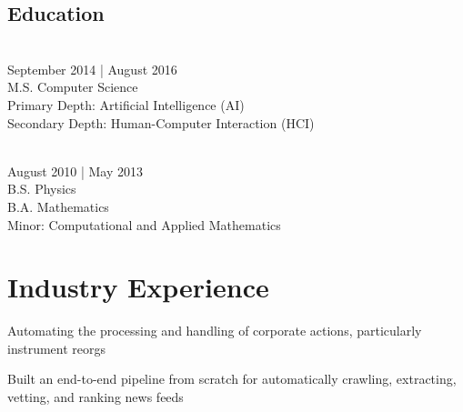\documentclass{onkursen-resume}
\begin{document}
\begin{multicols}{2}

\section*{Education}

\\
September 2014 | August 2016\\
M.S. Computer Science\\
Primary Depth: Artificial Intelligence (AI)\\
Secondary Depth: Human-Computer Interaction (HCI)\\

\vspace{6mm}

\\
August 2010 | May 2013\\
B.S. Physics\\
B.A. Mathematics\\
Minor: Computational and Applied Mathematics

\end{multicols}

\vspace{-1mm}

\hr

\section*{Industry Experience}

\begin{itemize*}
\item Automating the processing and handling of corporate actions, particularly instrument reorgs
\end{itemize*}
\vspace{-1mm}

\begin{itemize*}
\item Built an end-to-end pipeline from scratch for automatically crawling, extracting, vetting, and ranking news feeds
\end{itemize*}
\vspace{-1mm}
\end{document}
